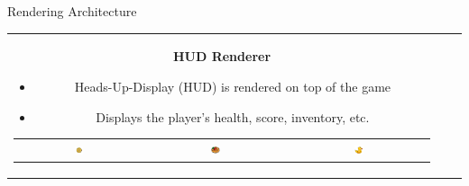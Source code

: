 \begin{frame}{Rendering Architecture}
\begin{tabular}{ccc}
        \parbox{0.3\textwidth}{
            \centering \textbf{HUD Renderer}
            \vspace{0.2cm}
            \begin{itemize}
                \item Heads-Up-Display (HUD) is rendered on top of the game
                \item Displays the player's health, score, inventory, etc.
            \end{itemize}
            \vspace{0.5cm}
            \centering
            \begin{tabular}{ccc}
                \includegraphics[width=0.07\textwidth]{../../assets/texture/coin.png} &
                \includegraphics[width=0.07\textwidth]{../../assets/texture/kaiserschmarrn.png} &
                \includegraphics[width=0.07\textwidth]{../../assets/texture/duck.png}
            \end{tabular}
        }
    \end{tabular}
\end{frame}

